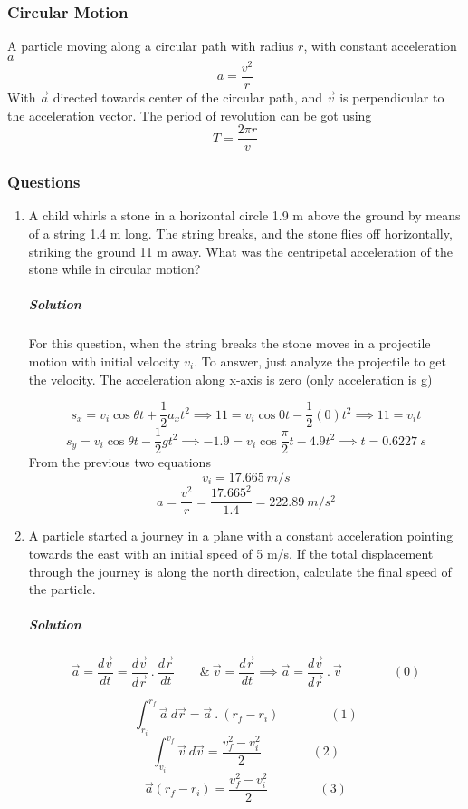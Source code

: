 \documentclass{article}
\begin{document}
\subsubsection{Circular Motion}

A particle moving along a circular path with radius $ r $, with constant acceleration $a $
\[
	a = \frac{v^2}{r}
\]
With $ \vec{ a } $ directed towards center  of the circular path, and $ \vec{ v } $ is perpendicular to the acceleration vector. The period of revolution can be got using 
\[
	T = \frac{ 2 \pi r }{v}
\]

\subsubsection{Questions}
\begin{enumerate}[1.]
	\item A  child  whirls  a  stone  in  a  horizontal  circle 1.9 m above  the  ground  by  means  of  a string 1.4 m long.  The  string  breaks,  and  the  stone  flies  off  horizontally,  striking  the ground 11 m away.  What  was  the  centripetal  acceleration  of  the  stone  while  in  circular motion? 
		\subparagraph{Solution} For this question, when the string breaks the stone moves in a projectile motion with initial velocity $ v_i $. To answer, just analyze the projectile to get the velocity. The acceleration along x-axis is zero (only acceleration is g)

		\[
			s_x = v_i \cos{ \theta }  t+  \frac{1}{2} a_x t^2 \implies 11 = v_i \cos{ 0 } t - \frac{1}{2} (0) t^2 \implies 11 = v_i t
		\]
		\[
			s_y = v_i \cos{ \theta } t - \frac{1}{2} g t^2 \implies -1.9 = v_i \cos{ \frac{\pi}{2} } t - 4.9 t^2 \implies t =  0.6227\ s
		\]
		From the previous two equations
		\[
			v_i = 17.665\ m / s
		\]
		\[
			a = \frac{v^2}{r} = \frac{17.665^2}{1.4} = 222.89\ m / s^2
		\]

	\item A particle started a journey in a plane with a constant acceleration pointing towards the east with an initial speed of 5 m/s. If the total displacement through the journey is along the north direction, calculate the final speed of the particle.
		\subparagraph{Solution}
		\[
			\vec{ a } = \frac{ d \vec{ v } }{ dt } = \frac{ d\vec{ v } }{ d \vec{ r } }\ .\ \frac{ d \vec{ r } }{ dt } \qquad \&\ \vec{ v }= \frac{ d \vec{ r } }{ d t }  \implies \vec{ a } = \frac{ d \vec{ v } }{ d \vec{ r } }\ .\ \vec{ v }   \qquad \qquad  (0)
		\]

		\[
			\int^{r_f}_{r_i} \vec{ a }\ d \vec{ r } = \vec{ a } \ . \   (r_f-r_i) \qquad \qquad (1)
		\]
		\[
			\int^{v_f}_{v_i} \vec{ v }\ d \vec{ v }  =  \frac{v_f^2 - v_i^2 }{2} \qquad \qquad (2)
		\]
		\[
			\vec{ a } (r_f - r_i) =  \frac{v_f^2 - v_i^2 }{2} \qquad  \qquad (3)
		\]



\end{enumerate}
\end{document}
